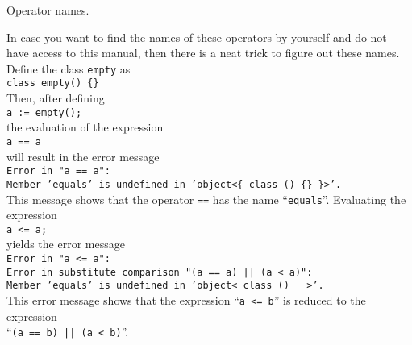 \begin{enumerate}
\begin{table}[!hbt]
        \caption{Operator names.}
        \label{tab:operator-names}
      \end{table}
      
      In case you want to find the names of these operators by yourself and do not have access to
      this manual, then there is a neat trick to figure out these names.  Define the class
      \texttt{empty} as
      \\[0.2cm]
      \hspace*{1.3cm}
      \texttt{class empty() \{\}}
      \\[0.2cm]
      Then, after defining
      \\[0.2cm]
      \hspace*{1.3cm}
      \texttt{a := empty();}
      \\[0.2cm]
      the evaluation of the expression
      \\[0.2cm]
      \hspace*{1.3cm}
      \texttt{a == a}
      \\[0.2cm]
      will result in the error message
      \\[0.2cm]
      \hspace*{1.3cm}
      \texttt{Error in "a == a":}       \\
      \hspace*{1.3cm}
      \texttt{Member 'equals' is undefined in 'object<\{ class () \{\} \}>'.}
      \\[0.2cm]
      This message shows that the operator \texttt{==} has the name ``\texttt{equals}''.  Evaluating
      the expression
      \\[0.2cm]
      \hspace*{1.3cm}
      \texttt{a <= a;}
      \\[0.2cm]
      yields the error message
      \\[0.2cm]
      \hspace*{1.3cm}
      \texttt{Error in "a <= a":} \\
      \hspace*{1.3cm}
      \texttt{Error in substitute comparison "(a == a) || (a < a)":} \\
      \hspace*{1.3cm}
      \texttt{Member 'equals' is undefined in 'object<{ class () {  } }>'.}
      \\[0.2cm]
      This error message shows that the expression ``\texttt{a <= b}'' is reduced to the expression \\
      ``\texttt{(a == b) || (a < b)}''.


\end{enumerate}
